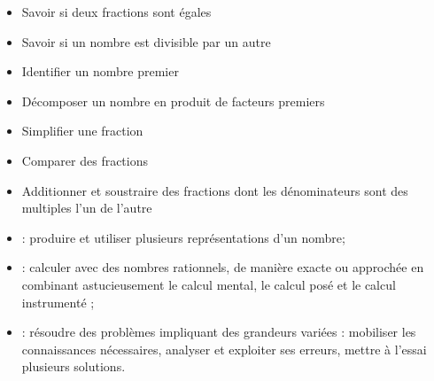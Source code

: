 \begin{myobj}
	\begin{itemize}
		
		\item Savoir si deux fractions sont égales
		\item Savoir si un nombre est divisible par un autre
		\item Identifier un nombre premier
		\item Décomposer un nombre en produit de facteurs premiers
		\item Simplifier une fraction
		\item Comparer des fractions
		\item Additionner et soustraire des fractions dont les dénominateurs sont des multiples l’un de l’autre
			
	\end{itemize}
\end{myobj}

\vspace*{-0.3cm}

\begin{mycomp}
	\begin{itemize}
		\item {} :  produire et utiliser plusieurs représentations d’un nombre;
		\item {} :  calculer avec des nombres rationnels, de manière exacte ou approchée en combinant astucieusement le calcul mental, le calcul posé et le calcul instrumenté ;
		\item {} :  résoudre des problèmes impliquant des grandeurs variées : mobiliser les connaissances nécessaires, analyser et exploiter ses erreurs, mettre à l’essai plusieurs solutions.		
	\end{itemize}
\end{mycomp}


